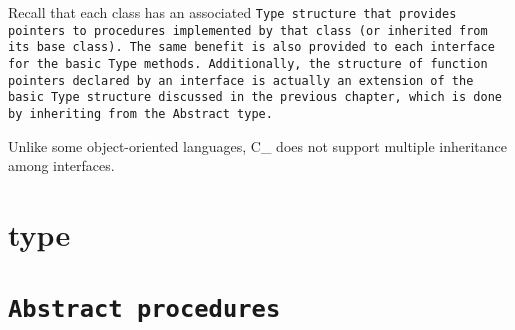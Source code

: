 Recall that each class has an associated \tt{Type} structure that provides
pointers to procedures implemented by that class (or inherited from its base class).
The same benefit is also provided to each interface for the basic \tt{Type} methods.
Additionally, the structure of function pointers declared by an interface
is actually an extension of the basic \tt{Type} structure discussed in the
previous chapter, which is done by inheriting from the \tt{Abstract} type.

\note Unlike some object-oriented languages,
C\_ does not support multiple inheritance among interfaces.

\section{ type}


\section{\tt{Abstract} procedures}








